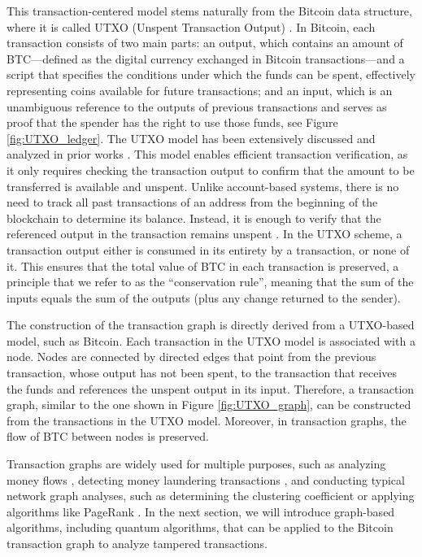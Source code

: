 \documentclass[nofootinbib,aps,prd,reprint,superscriptaddress,floatfix]{revtex4-2}
\begin{document}
This transaction-centered model stems naturally from the Bitcoin data structure, where it is called UTXO (Unspent Transaction Output) \cite{UTXO}. In Bitcoin, each transaction consists of two main parts: an output, which contains an amount of BTC—defined as the digital currency exchanged in Bitcoin transactions—and a script that specifies the conditions under which the funds can be spent, effectively representing coins available for future transactions; and an input, which is an unambiguous reference to the outputs of previous transactions and serves as proof that the spender has the right to use those funds, see Figure \ref{fig:UTXO_ledger}. The UTXO model has been extensively discussed and analyzed in prior works \cite{Didactic_UTXO,Formal_UTXO}. This model enables efficient transaction verification, as it only requires checking the transaction output to confirm that the amount to be transferred is available and unspent. Unlike account-based systems, there is no need to track all past transactions of an address from the beginning of the blockchain to determine its balance. Instead, it is enough to verify that the referenced output in the transaction remains unspent \cite{Didactic_UTXO}. In the UTXO scheme, a transaction output either is consumed in its entirety by a transaction, or none of it. This ensures that the total value of BTC in each transaction is preserved, a principle that we refer to as the ``conservation rule'', meaning that the sum of the inputs equals the sum of the outputs (plus any change returned to the sender).

The construction of the transaction graph is directly derived from a UTXO-based model, such as Bitcoin. Each transaction in the UTXO model is associated with a node. Nodes are connected by directed edges that point from the previous transaction, whose output has not been spent, to the transaction that receives the funds and references the unspent output in its input. Therefore, a transaction graph, similar to the one shown in Figure \ref{fig:UTXO_graph}, can be constructed from the transactions in the UTXO model. Moreover, in transaction graphs, the flow of BTC between nodes is preserved.

Transaction graphs are widely used for multiple purposes, such as analyzing money flows \cite{Transaction_graph_analysis}, detecting money laundering transactions \cite{Money_laundering}, and conducting typical network graph analyses, such as determining the clustering coefficient or applying algorithms like PageRank \cite{PageRank_transaction_graph}. In the next section, we will introduce graph-based algorithms, including quantum algorithms, that can be applied to the Bitcoin transaction graph to analyze tampered transactions.
\end{document}
